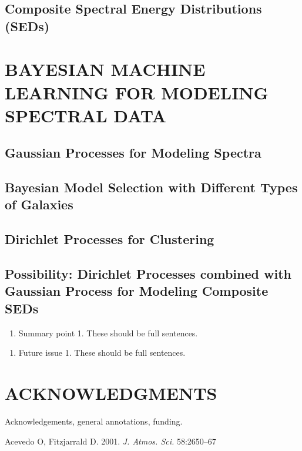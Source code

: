 \documentclass{ar-1col}
\begin{document}
\subsection{Composite Spectral Energy Distributions (SEDs)}

\section{BAYESIAN MACHINE LEARNING FOR MODELING SPECTRAL DATA}

\subsection{Gaussian Processes for Modeling Spectra}

\subsection{Bayesian Model Selection with Different Types of Galaxies}

\subsection{Dirichlet Processes for Clustering}

\subsection{Possibility: Dirichlet Processes combined with Gaussian Process for Modeling Composite SEDs}


\begin{summary}
\begin{enumerate}
\item Summary point 1. These should be full sentences.
\end{enumerate}
\end{summary}

\begin{issues}
\begin{enumerate}
\item Future issue 1. These should be full sentences.
\end{enumerate}
\end{issues}


\section*{ACKNOWLEDGMENTS}
Acknowledgements, general annotations, funding.

\begin{thebibliography}{00}

Acevedo O, Fitzjarrald D. 2001.
\textit{J. Atmos. Sci.} 58:2650--67


\end{thebibliography}
\end{document}
